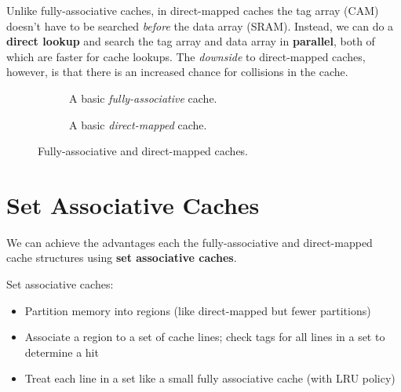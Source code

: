 
Unlike fully-associative caches, in direct-mapped caches the tag array (CAM) doesn't have to be searched \emph{before} the data array (SRAM). Instead, we can do a \textbf{direct lookup} and search the tag array and data array in \textbf{parallel}, both of which are faster for cache lookups. The \emph{downside} to direct-mapped caches, however, is that there is an increased chance for collisions in the cache.

\begin{figure}[H]
  \centering
  \begin{subfigure}[b]{0.45\textwidth}
    \centering
    \scriptsize
    \caption{A basic \emph{fully-associative} cache.}
    \label{fig:fullyassociative}
  \end{subfigure}
  \hfill
  \begin{subfigure}[b]{0.45\textwidth}
    \centering
    \scriptsize
    \caption{A basic \emph{direct-mapped} cache.}
    \label{fig:directmapped}
  \end{subfigure}
  \caption{Fully-associative and direct-mapped caches.}
\end{figure}

\section{Set Associative Caches}
We can achieve the advantages each the fully-associative and direct-mapped cache structures using \textbf{set associative caches}.

\begin{definition}
  Set associative caches:
  \begin{itemize}
    \item Partition memory into regions (like direct-mapped but fewer partitions)
    \item Associate a region to a set of cache lines; check tags for all lines in a set to determine a hit
    \item Treat each line in a set like a small fully associative cache (with LRU policy)
  \end{itemize}
\end{definition}

